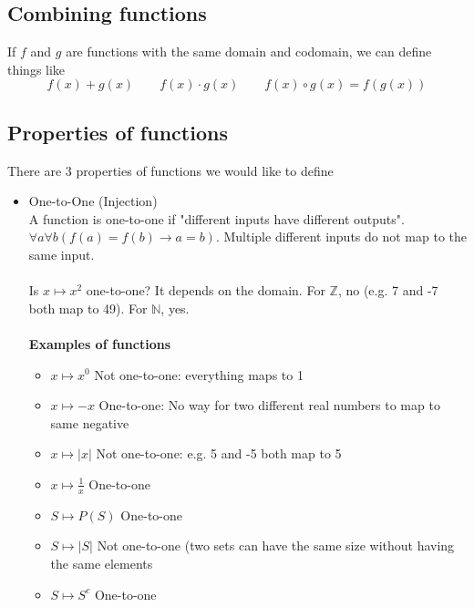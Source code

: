 \documentclass[12pt]{article}
\begin{document}
	\subsection{Combining functions}
	If $f$ and $g$ are functions with the same domain and codomain, we can define things like
	$$f(x) + g(x) \qquad f(x) \cdot g(x) \qquad f(x) \circ g(x) = f(g(x))$$
	\subsection{Properties of functions}
	There are 3 properties of functions we would like to define
	\begin{itemize}
		\item One-to-One (Injection) \\
			A function is one-to-one if "different inputs have different outputs". $\forall a \forall b(f(a) = f(b) \rightarrow a = b)$. Multiple different inputs do not map to the same input. \\\\
			Is $x \mapsto x^2$ one-to-one? It depends on the domain. For $\mathbb{Z}$, no (e.g. 7 and -7 both map to 49). For $\mathbb{N}$, yes. \\\\
			\textbf{Examples of functions}
			\begin{itemize}
				\item $x \mapsto x^0$ Not one-to-one: everything maps to 1
				\item $x \mapsto -x$ One-to-one: No way for two different real numbers to map to same negative
				\item $x \mapsto |x|$ Not one-to-one: e.g. 5 and -5 both map to 5
				\item $x \mapsto \frac{1}{x}$ One-to-one
				\item $S \mapsto P(S)$ One-to-one
				\item $S \mapsto |S|$ Not one-to-one (two sets can have the same size without having the same elements
				\item $S \mapsto S^c$ One-to-one
			\end{itemize}
			
	\end{itemize}
	
\end{document}

